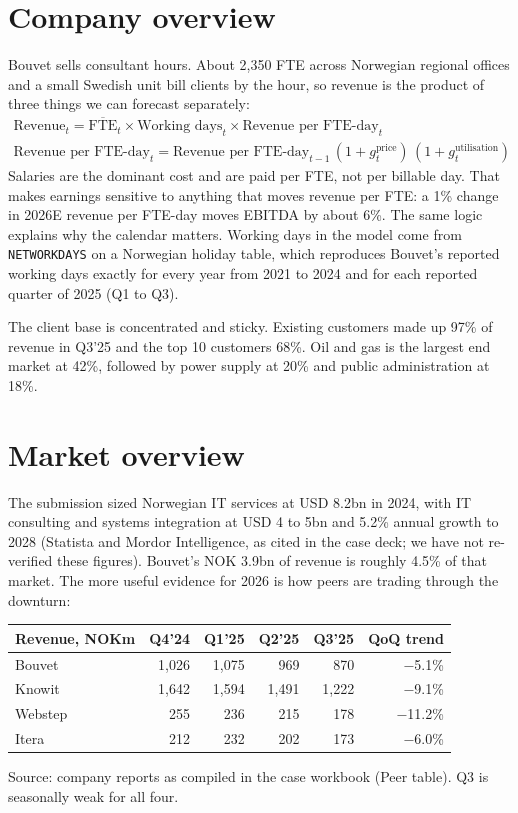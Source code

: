 \documentclass[10pt,a4paper]{article}
\begin{document}
\section{Company overview}
Bouvet sells consultant hours. About 2,350 FTE across Norwegian regional offices and a small Swedish unit bill clients by the hour, so revenue is the product of three things we can forecast separately:
\begin{gather*}
\text{Revenue}_t = \overline{\text{FTE}}_t \times \text{Working days}_t \times \text{Revenue per FTE-day}_t \\
\text{Revenue per FTE-day}_t = \text{Revenue per FTE-day}_{t-1}\,(1+g^{\text{price}}_t)\,(1+g^{\text{utilisation}}_t)
\end{gather*}
Salaries are the dominant cost and are paid per FTE, not per billable day. That makes earnings sensitive to anything that moves revenue per FTE: a 1\% change in 2026E revenue per FTE-day moves EBITDA by about 6\%. The same logic explains why the calendar matters. Working days in the model come from \texttt{NETWORKDAYS} on a Norwegian holiday table, which reproduces Bouvet's reported working days exactly for every year from 2021 to 2024 and for each reported quarter of 2025 (Q1 to Q3).

The client base is concentrated and sticky. Existing customers made up 97\% of revenue in Q3'25 and the top 10 customers 68\%. Oil and gas is the largest end market at 42\%, followed by power supply at 20\% and public administration at 18\%.

\section{Market overview}
The submission sized Norwegian IT services at USD 8.2bn in 2024, with IT consulting and systems integration at USD 4 to 5bn and 5.2\% annual growth to 2028 (Statista and Mordor Intelligence, as cited in the case deck; we have not re-verified these figures). Bouvet's NOK 3.9bn of revenue is roughly 4.5\% of that market. The more useful evidence for 2026 is how peers are trading through the downturn:

\begin{center}
\small
\begin{tabularx}{0.9\textwidth}{@{}lRRRRR@{}}
\toprule
\textbf{Revenue, NOKm} & \textbf{Q4'24} & \textbf{Q1'25} & \textbf{Q2'25} & \textbf{Q3'25} & \textbf{QoQ trend} \\
\midrule
Bouvet & 1,026 & 1,075 & 969 & 870 & $-$5.1\% \\
Knowit & 1,642 & 1,594 & 1,491 & 1,222 & $-$9.1\% \\
Webstep & 255 & 236 & 215 & 178 & $-$11.2\% \\
Itera & 212 & 232 & 202 & 173 & $-$6.0\% \\
\bottomrule
\end{tabularx}
\end{center}
{\footnotesize\color{ink2}Source: company reports as compiled in the case workbook (Peer table). Q3 is seasonally weak for all four.}
\end{document}
